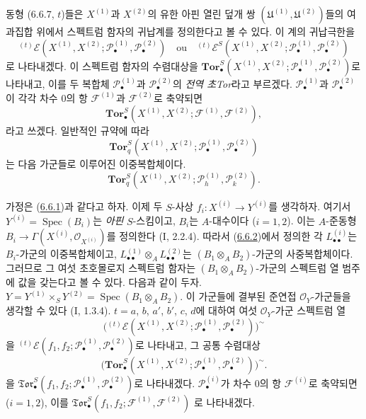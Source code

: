 \begin{env}[6.6.7]
동형 (6.6.7, $t$)들은 $X^{(1)}$과 $X^{(2)}$의 유한 아핀 열린 덮개
쌍 $(\mathfrak U^{(1)},\mathfrak U^{(2)})$들의 여과집합 위에서
스펙트럼 함자의 귀납계를 정의한다고 볼 수 있다. 이 계의 귀납극한을
\[
  {}^{(t)}\mathscr E
  (X^{(1)},X^{(2)};
   \mathscr P_\bullet^{(1)},\mathscr P_\bullet^{(2)})
  \quad\text{ou}\quad
  {}^{(t)}\mathscr E^S
  (X^{(1)},X^{(2)};
   \mathscr P_\bullet^{(1)},\mathscr P_\bullet^{(2)})
\]
로 나타내겠다. 이 스펙트럼 함자의 수렴대상을
$\mathbf{Tor}_\bullet^S
(X^{(1)},X^{(2)};\mathscr P_\bullet^{(1)},\mathscr P_\bullet^{(2)})$로
나타내고, 이를 두 복합체 $\mathscr P_\bullet^{(1)}$과
$\mathscr P_\bullet^{(2)}$의 \emph{전역 초Tor}라고 부르겠다.
$\mathscr P_\bullet^{(1)}$과 $\mathscr P_\bullet^{(2)}$이 각각 차수
0의 항 $\mathscr F^{(1)}$과 $\mathscr F^{(2)}$로 축약되면
\[
  \mathbf{Tor}_\bullet^S
  (X^{(1)},X^{(2)};\mathscr F^{(1)},\mathscr F^{(2)}),
\]
라고 쓰겠다. 일반적인 규약에 따라
\[
  \mathbf{Tor}_q^S
  (X^{(1)},X^{(2)};\mathscr P_\bullet^{(1)},\mathscr P_\bullet^{(2)})
\]
는 다음 가군들로 이루어진 이중복합체이다.
\[
  \mathbf{Tor}_q^S
  (X^{(1)},X^{(2)};\mathscr P_h^{(1)},\mathscr P_k^{(2)}).
\]
\end{env}

\begin{env}[6.6.8]
\label{III.6.6.8-fr}
가정은 (\hyperref[III.6.6.1-fr]{6.6.1})과 같다고 하자. 이제 두
$S$-사상 $f_i:X^{(i)}\to Y^{(i)}$를 생각하자. 여기서
$Y^{(i)}=\operatorname{Spec}(B_i)$는 \emph{아핀} $S$-스킴이고,
$B_i$는 $A$-대수이다 ($i=1,2$). 이는 $A$-준동형
$B_i\to\Gamma(X^{(i)},\mathscr O_{X^{(i)}})$를 정의한다 (I, 2.2.4).
따라서 (\hyperref[III.6.6.2-fr]{6.6.2})에서 정의한 각
$L_{\bullet\bullet}^{(i)}$는 $B_i$-가군의 이중복합체이고,
$L_{\bullet\bullet}^{(1)}\otimes_A L_{\bullet\bullet}^{(2)}$는
$(B_1\otimes_A B_2)$-가군의 사중복합체이다. 그러므로 그 여섯
초호몰로지 스펙트럼 함자는 $(B_1\otimes_A B_2)$-가군의 스펙트럼
열 범주에 값을 갖는다고 볼 수 있다. 다음과 같이 두자.
$Y=Y^{(1)}\times_S Y^{(2)}=\operatorname{Spec}(B_1\otimes_A B_2)$.
이 가군들에 결부된 준연접 $\mathscr O_Y$-가군들을 생각할 수 있다
(I, 1.3.4). $t=a$, $b$, $a'$, $b'$, $c$, $d$에 대하여 여섯
$\mathscr O_Y$-가군 스펙트럼 열
\[
  \bigl({}^{(t)}\mathscr E
  (X^{(1)},X^{(2)};
   \mathscr P_\bullet^{(1)},\mathscr P_\bullet^{(2)})\bigr)^{\sim}
\]
을
${}^{(t)}\mathscr E
(f_1,f_2;\mathscr P_\bullet^{(1)},\mathscr P_\bullet^{(2)})$로
나타내고, 그 공통 수렴대상
\[
  \bigl(\mathbf{Tor}_\bullet^S
  (X^{(1)},X^{(2)};
   \mathscr P_\bullet^{(1)},\mathscr P_\bullet^{(2)})\bigr)^{\sim}.
\]
을
$\mathfrak{Tor}_\bullet^S
(f_1,f_2;\mathscr P_\bullet^{(1)},\mathscr P_\bullet^{(2)})$로
나타내겠다. $\mathscr P_\bullet^{(i)}$가 차수 0의 항
$\mathscr F^{(i)}$로 축약되면 ($i=1,2$), 이를
$\mathfrak{Tor}_\bullet^S(f_1,f_2;\mathscr F^{(1)},\mathscr F^{(2)})$
로 나타내겠다.
\end{env}

